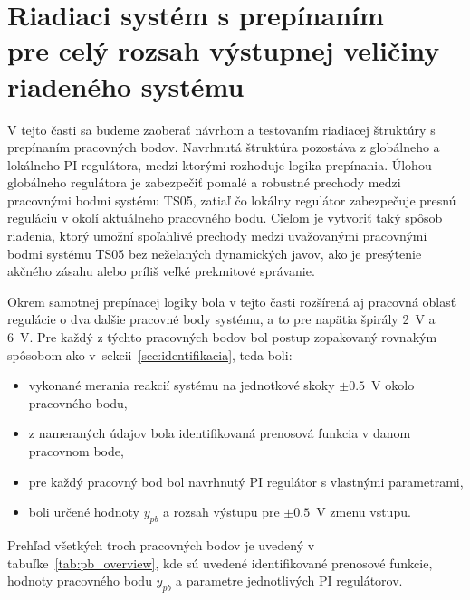 
\section[Riadiaci systém s prepínaním pre celý rozsah výstupnej veličiny riadeného systému]{Riadiaci systém s prepínaním\\pre celý rozsah výstupnej veličiny riadeného systému}
\label{sec:pi_switching}


V tejto časti sa budeme zaoberať návrhom a testovaním riadiacej štruktúry
s prepínaním pracovných bodov. Navrhnutá štruktúra pozostáva z globálneho
a lokálneho PI regulátora, medzi ktorými rozhoduje logika prepínania.
Úlohou globálneho regulátora je zabezpečiť pomalé a robustné prechody medzi
pracovnými bodmi systému TS05, zatiaľ čo lokálny regulátor zabezpečuje
presnú reguláciu v okolí aktuálneho pracovného bodu. Cieľom je vytvoriť
taký spôsob riadenia, ktorý umožní spoľahlivé prechody medzi uvažovanými
pracovnými bodmi systému TS05 bez neželaných dynamických javov, ako je
presýtenie akčného zásahu alebo príliš veľké prekmitové správanie.

Okrem samotnej prepínacej logiky bola v tejto časti rozšírená aj pracovná
oblasť regulácie o dva ďalšie pracovné body systému, a to pre napätia
špirály 2~V a 6~V. Pre každý z týchto pracovných bodov bol postup zopakovaný
rovnakým spôsobom ako v~sekcii~\ref{sec:identifikacia}, teda boli:
\begin{itemize}[leftmargin=0pt, labelsep=3mm, itemsep=0pt]
    \item vykonané merania reakcií systému na jednotkové skoky $\pm 0.5$~V okolo pracovného bodu,
    \item z nameraných údajov bola identifikovaná prenosová funkcia v danom pracovnom bode,
    \item pre každý pracovný bod bol navrhnutý PI regulátor s vlastnými parametrami,
    \item boli určené hodnoty $y_{pb}$ a rozsah výstupu pre $\pm 0.5$~V zmenu vstupu.
\end{itemize}

Prehľad všetkých troch pracovných bodov je uvedený v tabuľke~\ref{tab:pb_overview},  
kde sú uvedené identifikované prenosové funkcie, hodnoty pracovného bodu $y_{pb}$ a parametre jednotlivých PI regulátorov.

